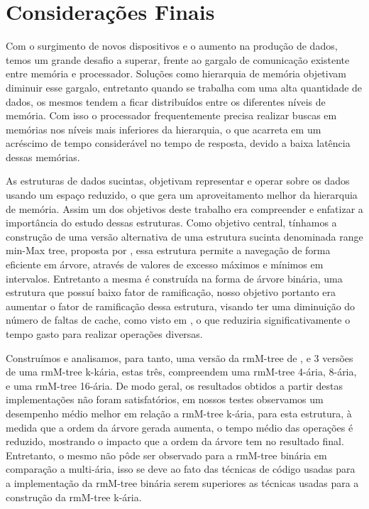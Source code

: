 \chapter{Considerações Finais}

Com o surgimento de novos dispositivos e o aumento na produção de dados, temos um grande desafio a superar, frente ao gargalo de comunicação existente entre
memória e processador. Soluções como hierarquia de memória objetivam diminuir esse gargalo, entretanto quando se trabalha com uma alta quantidade de dados,
os mesmos tendem a ficar distribuídos entre os diferentes níveis de memória. Com isso o processador frequentemente
precisa realizar buscas em memórias  nos níveis mais inferiores da hierarquia, o que acarreta em um acréscimo de tempo considerável no tempo de resposta, devido a baixa latência dessas memórias.

As estruturas de dados sucintas, objetivam representar e operar sobre os dados usando um espaço reduzido, o que gera um aproveitamento melhor da hierarquia de memória.
Assim um dos objetivos deste trabalho era compreender e enfatizar a importância do estudo dessas estruturas. Como objetivo central, tínhamos a construção de uma versão
alternativa de uma estrutura sucinta denominada range min-Max tree,  proposta por \citeauthor{paper-fully-functinal-succint-trees}, essa estrutura permite a navegação de forma eficiente
em árvore, através de valores de excesso máximos e mínimos em intervalos. Entretanto a mesma é construída na forma de árvore binária, uma estrutura que possuí baixo fator de ramificação,
nosso objetivo portanto era aumentar o fator de ramificação dessa estrutura, visando  ter uma diminuição do número de faltas de cache, como visto em \citep{paper-making-btree-cache},
o que reduziria significativamente o tempo gasto para realizar operações diversas. 

Construímos e analisamos, para tanto, uma versão da rmM-tree de \citeauthor{book-compact-data-structures}, e 3 versões de uma rmM-tree k-kária, estas três, compreendem uma rmM-tree 4-ária,
8-ária, e uma rmM-tree 16-ária. De modo geral, os resultados obtidos a partir destas implementações não foram satisfatórios, em nossos testes observamos um desempenho médio 
melhor em relação a rmM-tree k-ária, para esta estrutura, à medida que a ordem da árvore gerada aumenta, o tempo médio das operações é reduzido, mostrando o impacto que a ordem 
da árvore tem no resultado final. Entretanto, o mesmo não pôde ser observado para a rmM-tree binária em comparação a multi-ária, isso se deve ao fato das técnicas de código 
usadas para a implementação da rmM-tree
binária serem superiores as técnicas usadas para a construção da rmM-tree k-ária.

